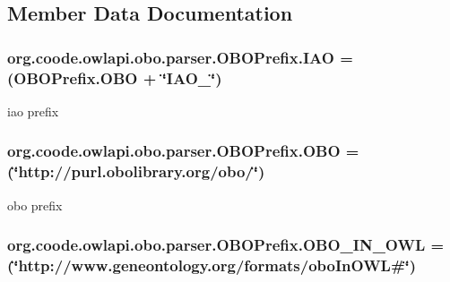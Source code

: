 \subsection{Member Data Documentation}
\hypertarget{enumorg_1_1coode_1_1owlapi_1_1obo_1_1parser_1_1_o_b_o_prefix_ab17056d15a7f13e16c596bd372619739}{
\subsubsection[{I\-A\-O}]{\setlength{\rightskip}{0pt plus 5cm}org.\-coode.\-owlapi.\-obo.\-parser.\-O\-B\-O\-Prefix.\-I\-A\-O =({\bf O\-B\-O\-Prefix.\-O\-B\-O} + \char`\"{}I\-A\-O\-\_\-\char`\"{})}}\label{enumorg_1_1coode_1_1owlapi_1_1obo_1_1parser_1_1_o_b_o_prefix_ab17056d15a7f13e16c596bd372619739}
iao prefix \hypertarget{enumorg_1_1coode_1_1owlapi_1_1obo_1_1parser_1_1_o_b_o_prefix_a2caaeadeee7bf92de51200e3ab3f2bec}{
\subsubsection[{O\-B\-O}]{\setlength{\rightskip}{0pt plus 5cm}org.\-coode.\-owlapi.\-obo.\-parser.\-O\-B\-O\-Prefix.\-O\-B\-O =(\char`\"{}http\-://purl.\-obolibrary.\-org/obo/\char`\"{})}}\label{enumorg_1_1coode_1_1owlapi_1_1obo_1_1parser_1_1_o_b_o_prefix_a2caaeadeee7bf92de51200e3ab3f2bec}
obo prefix \hypertarget{enumorg_1_1coode_1_1owlapi_1_1obo_1_1parser_1_1_o_b_o_prefix_a175fee974ad624961226496c349da916}{
\subsubsection[{O\-B\-O\-\_\-\-I\-N\-\_\-\-O\-W\-L}]{\setlength{\rightskip}{0pt plus 5cm}org.\-coode.\-owlapi.\-obo.\-parser.\-O\-B\-O\-Prefix.\-O\-B\-O\-\_\-\-I\-N\-\_\-\-O\-W\-L =(\char`\"{}http\-://www.\-geneontology.\-org/formats/obo\-In\-O\-W\-L\#\char`\"{})}}\label{enumorg_1_1coode_1_1owlapi_1_1obo_1_1parser_1_1_o_b_o_prefix_a175fee974ad624961226496c349da916}
